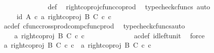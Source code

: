 \begin{isabellebody}
\ \ \ \ \ \ \ \ \ \ \ \ \isamarkupfalse%
\ {\isasymphi}{\isacharunderscore}{\kern0pt}def\ \isamarkupfalse%
\ right{\isacharunderscore}{\kern0pt}coproj{\isacharunderscore}{\kern0pt}cfunc{\isacharunderscore}{\kern0pt}coprod\ \isamarkupfalse%
\ {\isacharparenleft}{\kern0pt}typecheck{\isacharunderscore}{\kern0pt}cfuncs{\isacharcomma}{\kern0pt}\ auto{\isacharparenright}{\kern0pt}\isanewline
\ \ \ \ \ \ \ \ \ \ \isamarkupfalse%
\ \isamarkupfalse%
\ {\isachardoublequoteopen}{\isachardot}{\kern0pt}{\isachardot}{\kern0pt}{\isachardot}{\kern0pt}\ {\isacharequal}{\kern0pt}\ {\isasymlangle}id\ A\ {\isasymcirc}\isactrlsub c\ a{\isacharprime}{\kern0pt}{\isacharcomma}{\kern0pt}\ right{\isacharunderscore}{\kern0pt}coproj\ B\ C\ {\isasymcirc}\isactrlsub c\ c{\isacharprime}{\kern0pt}{\isasymrangle}{\isachardoublequoteclose}\isanewline
\ \ \ \ \ \ \ \ \ \ \ \ \isamarkupfalse%
\ a{\isacharprime}{\kern0pt}c{\isacharprime}{\kern0pt}{\isacharunderscore}{\kern0pt}def\ cfunc{\isacharunderscore}{\kern0pt}cross{\isacharunderscore}{\kern0pt}prod{\isacharunderscore}{\kern0pt}comp{\isacharunderscore}{\kern0pt}cfunc{\isacharunderscore}{\kern0pt}prod\ \isamarkupfalse%
\ {\isacharparenleft}{\kern0pt}typecheck{\isacharunderscore}{\kern0pt}cfuncs{\isacharcomma}{\kern0pt}auto{\isacharparenright}{\kern0pt}\isanewline
\ \ \ \ \ \ \ \ \ \ \isamarkupfalse%
\ \isamarkupfalse%
\ {\isachardoublequoteopen}{\isachardot}{\kern0pt}{\isachardot}{\kern0pt}{\isachardot}{\kern0pt}\ {\isacharequal}{\kern0pt}\ \ {\isasymlangle}a{\isacharprime}{\kern0pt}{\isacharcomma}{\kern0pt}\ right{\isacharunderscore}{\kern0pt}coproj\ B\ C\ {\isasymcirc}\isactrlsub c\ c{\isacharprime}{\kern0pt}{\isasymrangle}{\isachardoublequoteclose}\isanewline
\ \ \ \ \ \ \ \ \ \ \ \ \isamarkupfalse%
\ a{\isacharprime}{\kern0pt}c{\isacharprime}{\kern0pt}{\isacharunderscore}{\kern0pt}def\ id{\isacharunderscore}{\kern0pt}left{\isacharunderscore}{\kern0pt}unit{}\ \isamarkupfalse%
\ force\isanewline
\ \ \ \ \ \ \ \ \ \ \isamarkupfalse%
\ \isamarkupfalse%
\ {\isachardoublequoteopen}{\isasymlangle}a{\isacharcomma}{\kern0pt}\ right{\isacharunderscore}{\kern0pt}coproj\ B\ C\ {\isasymcirc}\isactrlsub c\ c{\isasymrangle}\ {\isacharequal}{\kern0pt}\ {\isasymlangle}a{\isacharprime}{\kern0pt}{\isacharcomma}{\kern0pt}\ right{\isacharunderscore}{\kern0pt}coproj\ B\ C\ {\isasymcirc}\isactrlsub c\ c{\isacharprime}{\kern0pt}{\isasymrangle}{\isachardoublequoteclose}\isanewline

\end{isabellebody}

